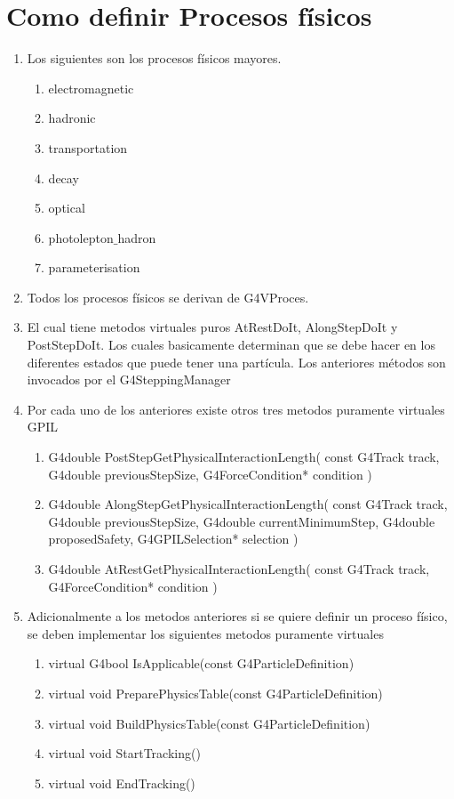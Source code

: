 \documentclass[10pt,a4paper,oneside]{book}
\begin{document}
\section*{Como definir Procesos físicos}
\begin{enumerate}
\item Los siguientes son los procesos físicos mayores. 
  \begin{enumerate}
  \item electromagnetic
  \item hadronic
  \item transportation
  \item decay
  \item optical
  \item photolepton$\_$hadron
  \item parameterisation
  \end{enumerate}
\item Todos los procesos físicos se derivan de G4VProces.
\item El cual tiene metodos virtuales puros AtRestDoIt, AlongStepDoIt y
  PostStepDoIt. Los cuales basicamente determinan que se debe hacer en
  los diferentes estados que puede tener una partícula. Los anteriores
  métodos son invocados por el G4SteppingManager
\item Por cada uno de los anteriores existe otros tres metodos
  puramente virtuales GPIL
  \begin{enumerate}
  \item G4double PostStepGetPhysicalInteractionLength( const G4Track track, G4double
    previousStepSize, G4ForceCondition* condition )
  \item G4double AlongStepGetPhysicalInteractionLength( const G4Track
    track, G4double previousStepSize, G4double currentMinimumStep,
    G4double proposedSafety, G4GPILSelection* selection )
  \item G4double AtRestGetPhysicalInteractionLength( const G4Track
    track, G4ForceCondition* condition )
  \end{enumerate}
\item Adicionalmente a los metodos anteriores si se quiere definir un
  proceso físico, se deben implementar los siguientes metodos
  puramente virtuales
  \begin{enumerate}
  \item virtual G4bool IsApplicable(const G4ParticleDefinition)
  \item virtual void PreparePhysicsTable(const G4ParticleDefinition)
  \item virtual void BuildPhysicsTable(const G4ParticleDefinition)
  \item virtual void StartTracking()
  \item virtual void EndTracking()
  \end{enumerate}


\end{enumerate}
\end{document}
